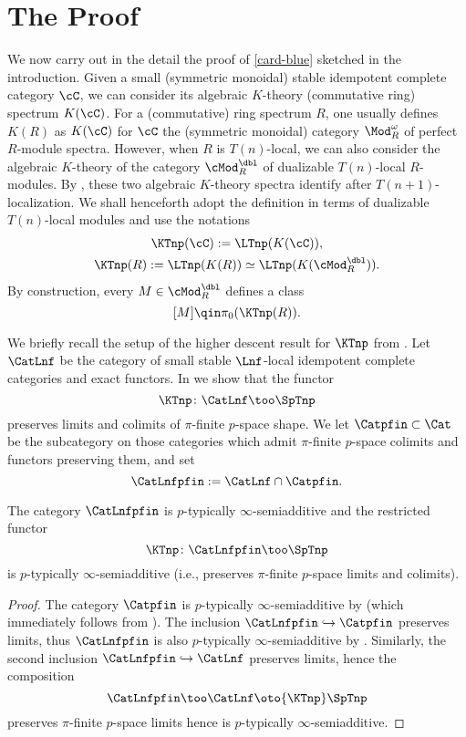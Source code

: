 \documentclass[english]{article}
\begin{document}
\section{The Proof}

We now carry out in the detail the proof of \cref{card-blue} sketched in the introduction.
Given a small (symmetric monoidal) stable idempotent complete category $\cC$, we can consider its algebraic $K$-theory (commutative ring) spectrum $K(\cC)$. 
For a (commutative) ring spectrum $R$, one usually defines $K(R)$ as $K(\cC)$ for $\cC$ the (symmetric monoidal) category $\Mod_R^\omega$ of perfect $R$-module spectra. 
However, when $R$ is $T(n)$-local, we can also consider the algebraic $K$-theory of the category $\cMod_R^\dbl$ of dualizable $T(n)$-local $R$-modules. 
By \cite[Proposition 4.15]{clausen2020descent}, these two algebraic $K$-theory spectra identify after $T(n+1)$-localization. 
We shall henceforth adopt the definition in terms of dualizable $T(n)$-local modules and use the notations
\begin{gather*} 
    \KTnp(\cC) := \LTnp(K(\cC)), \\
    \KTnp(R) := \LTnp(K(R)) \simeq \LTnp(K(\cMod_R^\dbl)).
\end{gather*}
By construction, every $M\in \cMod_R^\dbl$ defines a class 
\[
    [M] \qin \pi_0(\KTnp(R)).
\]

We briefly recall the setup of the higher descent result for $\KTnp$ from \cite{cycloredshift}. Let $\CatLnf$ be the category of small stable $\Lnf$-local idempotent complete categories and exact functors. In \cite[Theorem A]{cycloredshift} we show that the functor
\[
    \KTnp \colon \CatLnf \too \SpTnp
\]
preserves limits and colimits of $\pi$-finite $p$-space shape. 
We let $\Catpfin \subset \Cat$ be the subcategory on those categories which admit $\pi$-finite $p$-space colimits and functors preserving them, and set
\[
    \CatLnfpfin := \CatLnf \cap \Catpfin.
\]

\begin{prop}\label{KTnp_Sadd}
    The category $\CatLnfpfin$ is $p$-typically $\infty$-semiadditive and the restricted functor
    \[
        \KTnp \colon \CatLnfpfin \too \SpTnp
    \]
    is $p$-typically $\infty$-semiadditive (i.e., preserves $\pi$-finite $p$-space limits and colimits).
\end{prop}

\begin{proof}
    The category $\Catpfin$ is $p$-typically $\infty$-semiadditive by \cite[Proposition 2.2.7]{AmbiHeight} (which immediately follows from \cite[Proposition 5.26]{harpaz2020ambidexterity}).
    The inclusion $\CatLnfpfin \hookrightarrow \Catpfin$ preserves limits, thus $\CatLnfpfin$ is also $p$-typically $\infty$-semiadditive by \cite[Proposition 2.1.4(3)]{AmbiHeight}. Similarly, the second inclusion $\CatLnfpfin \hookrightarrow \CatLnf$ preserves limits, hence the composition
    \[
        \CatLnfpfin \too
        \CatLnf \oto{\KTnp}
        \SpTnp
    \]
    preserves $\pi$-finite $p$-space limits hence is $p$-typically $\infty$-semiadditive.
\end{proof}
\end{document}
